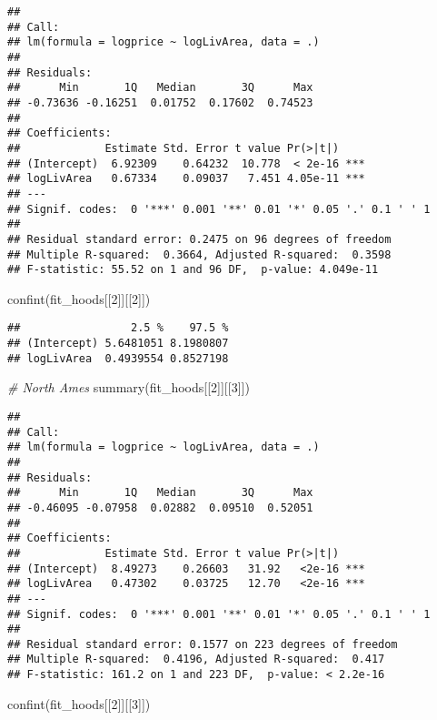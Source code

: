 \documentclass[
]{article}
\newenvironment{Shaded}{\begin{snugshade}}{\end{snugshade}}
\newcommand{\CommentTok}[1]{\textcolor[rgb]{0.56,0.35,0.01}{\textit{#1}}}
\newcommand{\DecValTok}[1]{\textcolor[rgb]{0.00,0.00,0.81}{#1}}
\newcommand{\FunctionTok}[1]{\textcolor[rgb]{0.00,0.00,0.00}{#1}}
\newcommand{\NormalTok}[1]{#1}
\begin{document}
\begin{verbatim}
## 
## Call:
## lm(formula = logprice ~ logLivArea, data = .)
## 
## Residuals:
##      Min       1Q   Median       3Q      Max 
## -0.73636 -0.16251  0.01752  0.17602  0.74523 
## 
## Coefficients:
##             Estimate Std. Error t value Pr(>|t|)    
## (Intercept)  6.92309    0.64232  10.778  < 2e-16 ***
## logLivArea   0.67334    0.09037   7.451 4.05e-11 ***
## ---
## Signif. codes:  0 '***' 0.001 '**' 0.01 '*' 0.05 '.' 0.1 ' ' 1
## 
## Residual standard error: 0.2475 on 96 degrees of freedom
## Multiple R-squared:  0.3664, Adjusted R-squared:  0.3598 
## F-statistic: 55.52 on 1 and 96 DF,  p-value: 4.049e-11
\end{verbatim}

\begin{Shaded}
\begin{Highlighting}[]
\FunctionTok{confint}\NormalTok{(fit\_hoods[[}\DecValTok{2}\NormalTok{]][[}\DecValTok{2}\NormalTok{]])}
\end{Highlighting}
\end{Shaded}

\begin{verbatim}
##                 2.5 %    97.5 %
## (Intercept) 5.6481051 8.1980807
## logLivArea  0.4939554 0.8527198
\end{verbatim}

\begin{Shaded}
\begin{Highlighting}[]
\CommentTok{\# North Ames}
\FunctionTok{summary}\NormalTok{(fit\_hoods[[}\DecValTok{2}\NormalTok{]][[}\DecValTok{3}\NormalTok{]])}
\end{Highlighting}
\end{Shaded}

\begin{verbatim}
## 
## Call:
## lm(formula = logprice ~ logLivArea, data = .)
## 
## Residuals:
##      Min       1Q   Median       3Q      Max 
## -0.46095 -0.07958  0.02882  0.09510  0.52051 
## 
## Coefficients:
##             Estimate Std. Error t value Pr(>|t|)    
## (Intercept)  8.49273    0.26603   31.92   <2e-16 ***
## logLivArea   0.47302    0.03725   12.70   <2e-16 ***
## ---
## Signif. codes:  0 '***' 0.001 '**' 0.01 '*' 0.05 '.' 0.1 ' ' 1
## 
## Residual standard error: 0.1577 on 223 degrees of freedom
## Multiple R-squared:  0.4196, Adjusted R-squared:  0.417 
## F-statistic: 161.2 on 1 and 223 DF,  p-value: < 2.2e-16
\end{verbatim}

\begin{Shaded}
\begin{Highlighting}[]
\FunctionTok{confint}\NormalTok{(fit\_hoods[[}\DecValTok{2}\NormalTok{]][[}\DecValTok{3}\NormalTok{]])}
\end{Highlighting}
\end{Shaded}
\end{document}
